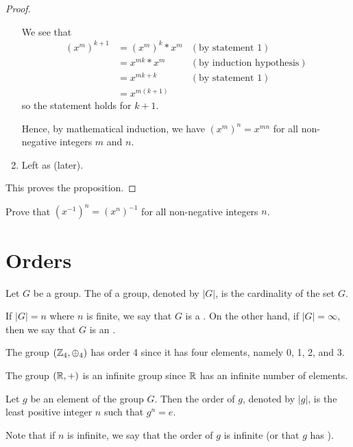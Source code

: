 \begin{proof}
\begin{enumerate}
        We see that
        \begin{align*}
            \left(x^m\right)^{k+1} &= \left(x^m\right)^k\ast x^m & (\text{by statement 1})\\
            &= x^{mk} \ast x^m & (\text{by induction hypothesis})\\
            &= x^{mk+k} & (\text{by statement 1})\\
            &= x^{m(k+1)}
        \end{align*}
        so the statement holds for $k+1$.

        Hence, by mathematical induction, we have $\left(x^m\right)^n = x^{mn}$ for all non-negative integers $m$ and $n$.

        \item Left as  (later).
    \end{enumerate}
    This proves the proposition.
\end{proof}
\begin{exercise}\label{exercise-swap-inverse-with-power}
    Prove that $(x^{-1})^n = (x^n)^{-1}$ for all non-negative integers $n$.
\end{exercise}

\section{Orders}
\begin{definition}
    Let $G$ be a group. The  of a group, denoted by $|G|$, is the cardinality of the set $G$.
\end{definition}

If $|G| = n$ where $n$ is finite, we say that $G$ is a . On the other hand, if $|G| = \infty$, then we say that $G$ is an .

\begin{example}
    The group $(\mathbb{Z}_4, \oplus_4)$ has order 4 since it has four elements, namely 0, 1, 2, and 3.
\end{example}

\begin{example}
    The group $(\mathbb{R}, +)$ is an infinite group since $\mathbb{R}$ has an infinite number of elements.
\end{example}

\begin{definition}
    Let $g$ be an element of the group $G$. Then the order of $g$, denoted by $|g|$, is the least positive integer $n$ such that $g^n = e$.
\end{definition}
Note that if $n$ is infinite, we say that the order of $g$ is infinite (or that $g$ has ).


